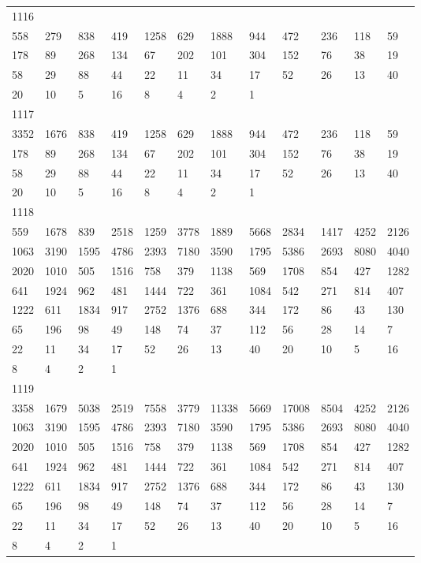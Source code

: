 \begin{longtable}{llllllllllll}
1116&&&&&&&&&&&\\
558& 279& 838& 419& 1258& 629& 1888& 944& 472& 236& 118& 59\\
178& 89& 268& 134& 67& 202& 101& 304& 152& 76& 38& 19\\
58& 29& 88& 44& 22& 11& 34& 17& 52& 26& 13& 40\\
20& 10& 5& 16& 8& 4& 2& 1& \\

1117&&&&&&&&&&&\\
3352& 1676& 838& 419& 1258& 629& 1888& 944& 472& 236& 118& 59\\
178& 89& 268& 134& 67& 202& 101& 304& 152& 76& 38& 19\\
58& 29& 88& 44& 22& 11& 34& 17& 52& 26& 13& 40\\
20& 10& 5& 16& 8& 4& 2& 1& \\

1118&&&&&&&&&&&\\
559& 1678& 839& 2518& 1259& 3778& 1889& 5668& 2834& 1417& 4252& 2126\\
1063& 3190& 1595& 4786& 2393& 7180& 3590& 1795& 5386& 2693& 8080& 4040\\
2020& 1010& 505& 1516& 758& 379& 1138& 569& 1708& 854& 427& 1282\\
641& 1924& 962& 481& 1444& 722& 361& 1084& 542& 271& 814& 407\\
1222& 611& 1834& 917& 2752& 1376& 688& 344& 172& 86& 43& 130\\
65& 196& 98& 49& 148& 74& 37& 112& 56& 28& 14& 7\\
22& 11& 34& 17& 52& 26& 13& 40& 20& 10& 5& 16\\
8& 4& 2& 1& \\

1119&&&&&&&&&&&\\
3358& 1679& 5038& 2519& 7558& 3779& 11338& 5669& 17008& 8504& 4252& 2126\\
1063& 3190& 1595& 4786& 2393& 7180& 3590& 1795& 5386& 2693& 8080& 4040\\
2020& 1010& 505& 1516& 758& 379& 1138& 569& 1708& 854& 427& 1282\\
641& 1924& 962& 481& 1444& 722& 361& 1084& 542& 271& 814& 407\\
1222& 611& 1834& 917& 2752& 1376& 688& 344& 172& 86& 43& 130\\
65& 196& 98& 49& 148& 74& 37& 112& 56& 28& 14& 7\\
22& 11& 34& 17& 52& 26& 13& 40& 20& 10& 5& 16\\
8& 4& 2& 1& \\


\end{longtable}
